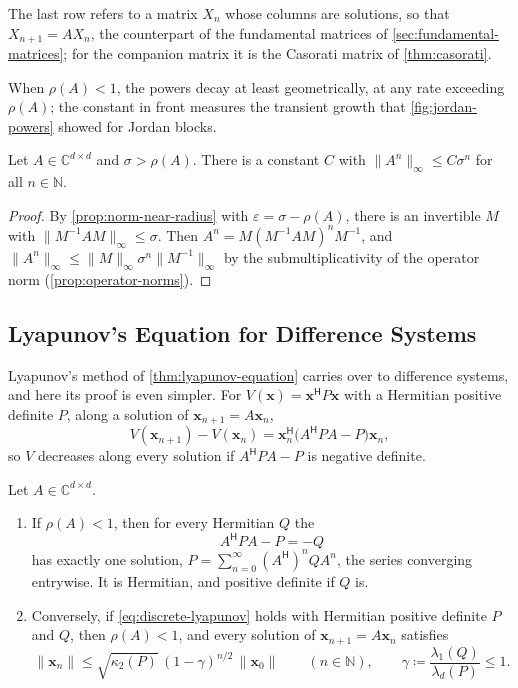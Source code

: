 The last row refers to a matrix $X_n$ whose columns are solutions, so that $X_{n+1}=AX_n$, the counterpart of the fundamental matrices of \cref{sec:fundamental-matrices}; for the companion matrix it is the Casorati matrix of \cref{thm:casorati}.

When $\rho(A)<1$, the powers decay at least geometrically, at any rate exceeding $\rho(A)$; the constant in front measures the transient growth that \cref{fig:jordan-powers} showed for Jordan blocks.

\begin{lemma}
\label{lem:power-bound}
Let $A\in\mathbb C^{d\times d}$ and $\sigma>\rho(A)$. There is a constant $C$ with $\|A^n\|_\infty\le C\sigma^n$ for all $n\in\mathbb N$.
\end{lemma}

\begin{proof}
By \cref{prop:norm-near-radius} with $\varepsilon=\sigma-\rho(A)$, there is an invertible $M$ with $\|M^{-1}AM\|_\infty\le\sigma$. Then $A^n=M(M^{-1}AM)^nM^{-1}$, and $\|A^n\|_\infty\le\|M\|_\infty\sigma^n\|M^{-1}\|_\infty$ by the submultiplicativity of the operator norm (\cref{prop:operator-norms}).
\end{proof}

\subsection{Lyapunov's Equation for Difference Systems}

Lyapunov's method of \cref{thm:lyapunov-equation} carries over to difference systems, and here its proof is even simpler. For $V(\mathbf x)=\mathbf x^{\mathsf H}P\mathbf x$ with a Hermitian positive definite $P$, along a solution of $\mathbf x_{n+1}=A\mathbf x_n$,
\[
V(\mathbf x_{n+1})-V(\mathbf x_n)=\mathbf x_n^{\mathsf H}\bigl(A^{\mathsf H}PA-P\bigr)\mathbf x_n ,
\]
so $V$ decreases along every solution if $A^{\mathsf H}PA-P$ is negative definite.

\begin{theorem}
\label{thm:discrete-lyapunov}
Let $A\in\mathbb C^{d\times d}$.
\begin{enumerate}
\item If $\rho(A)<1$, then for every Hermitian $Q$ the 
\begin{equation}
A^{\mathsf H}PA-P=-Q
\label{eq:discrete-lyapunov}
\end{equation}
has exactly one solution, $P=\sum_{n=0}^\infty(A^{\mathsf H})^nQA^n$, the series converging entrywise. It is Hermitian, and positive definite if $Q$ is.
\item Conversely, if \eqref{eq:discrete-lyapunov} holds with Hermitian positive definite $P$ and $Q$, then $\rho(A)<1$, and every solution of $\mathbf x_{n+1}=A\mathbf x_n$ satisfies
\[
\|\mathbf x_n\|\le\sqrt{\kappa_2(P)}\,(1-\gamma)^{n/2}\,\|\mathbf x_0\|\qquad(n\in\mathbb N),\qquad\gamma\coloneqq\frac{\lambda_1(Q)}{\lambda_d(P)}\le1 .
\]
\end{enumerate}
\end{theorem}

